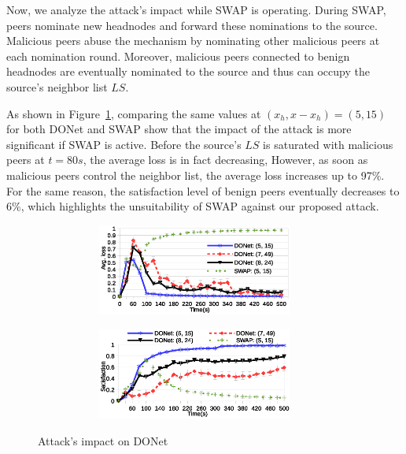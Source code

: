 Now, we analyze the attack's impact while SWAP is operating.
During SWAP, peers nominate new headnodes and forward these nominations to the source. 
Malicious peers abuse the mechanism by nominating other malicious peers at each nomination round. 
Moreover, malicious peers connected to benign headnodes are eventually nominated to the source and thus can occupy the source's neighbor list $LS$. 

As shown in Figure~\ref{subfig:avg-loss-donet}, comparing the same values at $(x_h, x-x_h)=(5, 15)$ for both DONet and SWAP show that the impact of the attack is more significant if SWAP is active.
Before the source's $LS$ is saturated with malicious peers at $t=80s$, the average loss is in fact decreasing, However, as soon as malicious peers control the neighbor list, the average loss increases up to 97\%. 
For the same reason, the satisfaction level of benign peers eventually decreases to 6\%, which highlights the unsuitability of SWAP against our proposed attack.




\begin{figure}[tb]
  \centering
  \begin{subfigure}[c]{0.95\columnwidth}
    \centering
    \includegraphics[width=8.4cm,height=3cm]{./Figures/avg-loss-donet.eps}
    \captionsetup{font=ninept}
    \label{subfig:avg-loss-donet}
  \end{subfigure}
  \begin{subfigure}[c]{0.95\columnwidth}
    \centering
    \includegraphics[width=8.4cm,height=3cm]{./Figures/satisfaction-donet.eps}
    \captionsetup{font=ninept}
    \label{subfig:satisfaction-donet}
  \end{subfigure}
  \caption{Attack's impact on DONet}%
  \label{fig:attack-results}
  \vspace{-4mm}
\end{figure}

